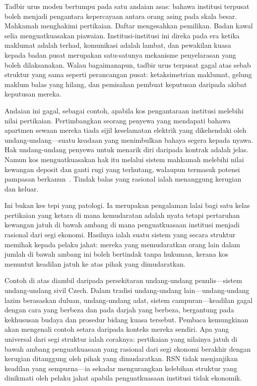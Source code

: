 \documentclass[11pt,a4paper,twocolumn]{article}
\begin{document}
Tadbir urus moden bertumpu pada satu andaian asas: bahawa institusi terpusat boleh menjadi pengantara kepercayaan antara orang asing pada skala besar. Mahkamah menghakimi pertikaian. Daftar mengesahkan pemilikan. Badan kawal selia menguatkuasakan piawaian. Institusi-institusi ini direka pada era ketika maklumat adalah terhad, komunikasi adalah lambat, dan pewakilan kuasa kepada badan pusat merupakan satu-satunya mekanisme penyelarasan yang boleh dilaksanakan. Walau bagaimanapun, tadbir urus terpusat gagal atas sebab struktur yang sama seperti perancangan pusat: ketaksimetrian maklumat, gelung maklum balas yang hilang, dan pemisahan pembuat keputusan daripada akibat keputusan mereka.

Andaian ini gagal, sebagai contoh, apabila kos pengantaraan institusi melebihi nilai pertikaian. Pertimbangkan seorang penyewa yang mendapati bahawa apartmen sewaan mereka tiada sijil keselamatan elektrik yang dikehendaki oleh undang-undang---suatu keadaan yang menimbulkan bahaya segera kepada nyawa. Hak undang-undang penyewa untuk menarik diri daripada kontrak adalah jelas. Namun kos menguatkuasakan hak itu melalui sistem mahkamah melebihi nilai kewangan deposit dan ganti rugi yang terhutang, walaupun termasuk potensi pampasan berkanun~\cite{czcourtfees}. Tindak balas yang rasional ialah menanggung kerugian dan keluar.

Ini bukan kes tepi yang patologi. Ia merupakan pengalaman lalai bagi satu kelas pertikaian yang ketara di mana kemudaratan adalah nyata tetapi pertaruhan kewangan jatuh di bawah ambang di mana penguatkuasaan institusi menjadi rasional dari segi ekonomi. Hasilnya ialah suatu sistem yang secara struktur memihak kepada pelaku jahat: mereka yang memudaratkan orang lain dalam jumlah di bawah ambang ini boleh bertindak tanpa hukuman, kerana kos menuntut keadilan jatuh ke atas pihak yang dimudaratkan.

Contoh di atas diambil daripada persekitaran undang-undang penulis---sistem undang-undang sivil Czech. Dalam tradisi undang-undang lain---undang-undang lazim berasaskan duluan, undang-undang adat, sistem campuran---keadilan gagal dengan cara yang berbeza dan pada darjah yang berbeza, bergantung pada kekhususan budaya dan prosedur bidang kuasa tersebut. Pembaca kemungkinan akan mengenali contoh setara daripada konteks mereka sendiri. Apa yang universal dari segi struktur ialah coraknya: pertikaian yang nilainya jatuh di bawah ambang penguatkuasaan yang rasional dari segi ekonomi berakhir dengan kerugian ditanggung oleh pihak yang dimudaratkan. RSN tidak menjanjikan keadilan yang sempurna---ia sekadar mengurangkan kelebihan struktur yang dinikmati oleh pelaku jahat apabila penguatkuasaan institusi tidak ekonomik.
\end{document}
